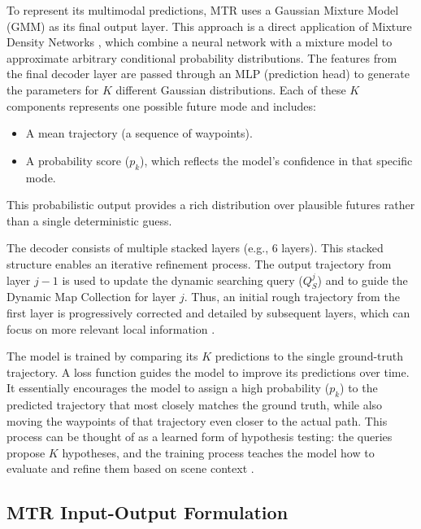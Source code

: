 To represent its multimodal predictions, MTR uses a Gaussian Mixture Model (GMM) as its final output layer. This approach is a direct application of Mixture Density Networks \cite{Bishop1994MDN}, which combine a neural network with a mixture model to approximate arbitrary conditional probability distributions. The features from the final decoder layer are passed through an MLP (prediction head) to generate the parameters for $K$ different Gaussian distributions. Each of these $K$ components represents one possible future mode and includes:
\begin{itemize}
    \item A mean trajectory (a sequence of waypoints).
    \item A probability score ($p_k$), which reflects the model's confidence in that specific mode.
\end{itemize}
This probabilistic output provides a rich distribution over plausible futures rather than a single deterministic guess.

The decoder consists of multiple stacked layers (e.g., 6 layers). This stacked structure enables an iterative refinement process. The output trajectory from layer $j-1$ is used to update the dynamic searching query ($Q_S^j$) and to guide the Dynamic Map Collection for layer $j$. Thus, an initial rough trajectory from the first layer is progressively corrected and detailed by subsequent layers, which can focus on more relevant local information \cite{Shi2022MTR}.

The model is trained by comparing its $K$ predictions to the single ground-truth trajectory. A loss function guides the model to improve its predictions over time. It essentially encourages the model to assign a high probability ($p_k$) to the predicted trajectory that most closely matches the ground truth, while also moving the waypoints of that trajectory even closer to the actual path. This process can be thought of as a learned form of hypothesis testing: the queries propose $K$ hypotheses, and the training process teaches the model how to evaluate and refine them based on scene context \cite{Shi2022MTR}.

\subsection{MTR Input-Output Formulation}
\label{sec:model_mtr_io}

